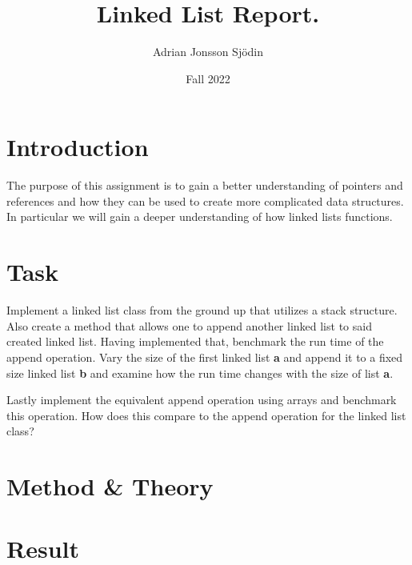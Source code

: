 \documentclass[a4paper,11pt]{article}
\begin{document}
\title{
    \textbf{Linked List Report.}
}
\author{Adrian Jonsson Sjödin}
\date{Fall 2022}

\maketitle

\section*{Introduction}
The purpose of this assignment is to gain a better understanding of pointers and references
and how they can be used to create more complicated data structures. In particular we will
gain a deeper understanding of how linked lists functions.

\section*{Task}
Implement a linked list class from the ground up that utilizes a stack structure. Also
create a method that allows one to append another linked list to said created linked list.
Having implemented that, benchmark the run time of the append operation. Vary the size of the
first linked list \textbf{a} and append it to a fixed size linked list \textbf{b} and
examine how the run time changes with the size of list \textbf{a}.

Lastly implement the equivalent append operation using arrays and benchmark this operation.
How does this compare to the append operation for the linked list class?

\section*{Method \& Theory}

\section*{Result}
\end{document}
